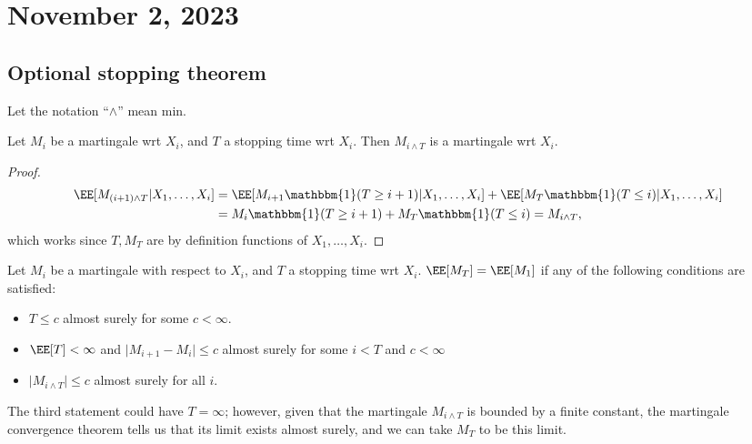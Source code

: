 \section{November 2, 2023}

\subsection{Optional stopping theorem}

Let the notation ``$\wedge$'' mean min.

\begin{theorem}
\lemlabel

Let $M_i$ be a martingale wrt $X_i$, and $T$ a stopping time wrt $X_i$. Then $M_{i\wedge T}$ is a martingale wrt $X_i$. 
\end{theorem}

\begin{proof}
\begin{align*}
	\EE[M_{(i+1)\wedge T}|X_1,\hdots,X_i] &= \EE[M_{i+1}\mathbbm{1}(T\geq i+1)|X_1,\hdots, X_i] + \EE[M_T\mathbbm{1}(T\leq i)|X_1,\hdots,X_i] \\
																				&= M_i\mathbbm{1}(T\geq i+1) + M_T\mathbbm{1}(T\leq i) = M_{i\wedge T},
\end{align*}
which works since $T,M_T$ are by definition functions of $X_1,\hdots, X_i$. 
\end{proof}

\begin{theorem}

Let $M_i$ be a martingale with respect to $X_i$, and $T$ a stopping time wrt $X_i$. $\EE[M_T] = \EE[M_1]$ if any of the following conditions are satisfied: 
\begin{itemize}
	\item $T\leq c$ almost surely for some $c < \infty$. 
	\item $\EE[T] < \infty$ and $\vert M_{i+1}-M_i\vert \leq c$ almost surely for some $i < T$ and $c < \infty$
	\item $\vert M_{i\wedge T}\vert \leq c$ almost surely for all $i$. 
\end{itemize}
\end{theorem}

The third statement could have $T=\infty$; however, given that the martingale $M_{i\wedge T}$ is bounded by a finite constant, the martingale convergence theorem tells us that its limit exists almost surely, and we can take $M_T$ to be this limit. 

